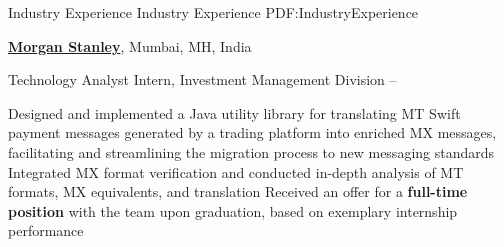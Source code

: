 \Section
{Industry\newline
Experience}
{Industry Experience}
{PDF:IndustryExperience}

\Entry
\href{https://www.morganstanley.com/about-us/global-offices/asia-pacific/india}
{\textbf{Morgan Stanley}},
Mumbai, MH, India

\Gap
\BulletItem
Technology Analyst Intern,
Investment Management Division
\hfill
{} --
\begin{Detail}
\SubBulletItem
Designed and implemented a Java utility library for translating MT Swift payment messages generated by a trading platform into enriched MX messages, facilitating and streamlining the migration process to new messaging standards
\SubBulletItem
Integrated MX format verification and conducted in-depth analysis of MT formats, MX equivalents, and translation
\SubBulletItem
Received an offer for a {\bf full-time position} with the team upon graduation, based on exemplary internship performance
\end{Detail}